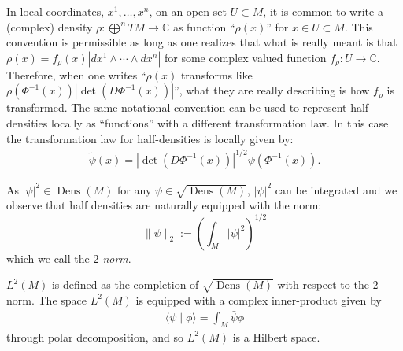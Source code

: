 \documentclass[final,leqno]{siamart}
\DeclareMathOperator{\Dens}{Dens}
\begin{document}
In local coordinates, $x^{1},\dots,x^{n}$, on an open set $U \subset M$, it is common to write a (complex) density $\rho: \bigoplus^{n}TM \to \mathbb{C}$ as function ``$\rho(x)$'' for $x \in U \subset M$.
This convention is permissible as long as one realizes that what is really meant is that $\rho(x) = f_{\rho}(x) | dx^{1} \wedge \cdots \wedge dx^{n} |$ for some complex valued function $f_{\rho}:U \to \mathbb{C}$.
Therefore, when one writes  ``$\rho(x)$ transforms like $\rho( \Phi^{-1}(x)) \left| \det( D \Phi^{-1}(x) ) \right|$'', what they are really describing is how $f_{\rho}$ is transformed.
The same notational convention can be used to represent half-densities locally as ``functions'' with a different transformation law.
In this case the transformation law for half-densities is locally given by:
\begin{align}
	\tilde{\psi}(x) = \left| \det \left( D\Phi^{-1} (x) \right) \right|^{1/2} \psi \left( \Phi^{-1}(x) \right). \label{eq:local transformation law}
\end{align}

As $|\psi|^{2} \in \Dens(M)$ for any $\psi \in \sqrt{\Dens(M)}$, $|\psi|^{2}$ can be integrated and we observe that half densities are naturally equipped with the norm: $$\| \psi \|_2 :=  \left( \int_M |\psi|^2 \right)^{1/2}$$ which we call the \emph{$2$-norm}.
\begin{definition}
	$L^{2}(M)$ is defined as the completion of $\sqrt{ \Dens(M)}$ with respect to the $2$-norm.
	The space $L^{2}(M)$ is equipped with a complex inner-product given by
	\begin{align}
		\langle \psi \mid \phi \rangle = \int_{M} \bar \psi \phi
	\end{align}
	through polar decomposition, and so $L^{2}(M)$ is a Hilbert space.
\end{definition}
\end{document}
